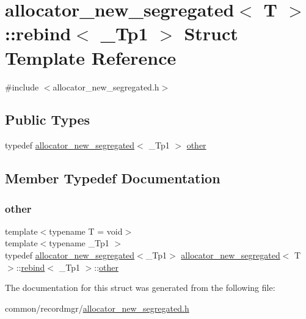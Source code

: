 \hypertarget{structallocator__new__segregated_1_1rebind}{}\section{allocator\+\_\+new\+\_\+segregated$<$ T $>$\+:\+:rebind$<$ \+\_\+\+Tp1 $>$ Struct Template Reference}
\label{structallocator__new__segregated_1_1rebind}


{\ttfamily \#include $<$allocator\+\_\+new\+\_\+segregated.\+h$>$}

\subsection*{Public Types}
\begin{DoxyCompactItemize}
\item 
typedef \hyperlink{classallocator__new__segregated}{allocator\+\_\+new\+\_\+segregated}$<$ \+\_\+\+Tp1 $>$ \hyperlink{structallocator__new__segregated_1_1rebind_accf32fad8c281c3a9e635ebd9713ae49}{other}
\end{DoxyCompactItemize}


\subsection{Member Typedef Documentation}
\mbox{\label{structallocator__new__segregated_1_1rebind_accf32fad8c281c3a9e635ebd9713ae49}} 
\subsubsection{\texorpdfstring{other}{other}}
{\footnotesize\ttfamily template$<$typename T  = void$>$ \\
template$<$typename \+\_\+\+Tp1 $>$ \\
typedef \hyperlink{classallocator__new__segregated}{allocator\+\_\+new\+\_\+segregated}$<$\+\_\+\+Tp1$>$ \hyperlink{classallocator__new__segregated}{allocator\+\_\+new\+\_\+segregated}$<$ T $>$\+::\hyperlink{structallocator__new__segregated_1_1rebind}{rebind}$<$ \+\_\+\+Tp1 $>$\+::\hyperlink{structallocator__new__segregated_1_1rebind_accf32fad8c281c3a9e635ebd9713ae49}{other}}



The documentation for this struct was generated from the following file\+:\begin{DoxyCompactItemize}
\item 
common/recordmgr/\hyperlink{allocator__new__segregated_8h}{allocator\+\_\+new\+\_\+segregated.\+h}\end{DoxyCompactItemize}
